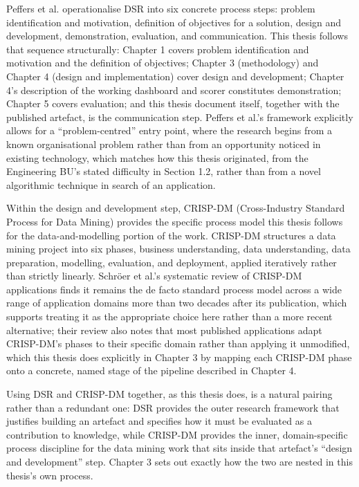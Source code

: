 \documentclass[12pt,oneside]{report}
\begin{document}
Peffers et al. \citep{peffers2007design} operationalise DSR into six
concrete process steps: problem identification and motivation,
definition of objectives for a solution, design and development,
demonstration, evaluation, and communication. This thesis follows that
sequence structurally: Chapter 1 covers problem identification and
motivation and the definition of objectives; Chapter 3 (methodology) and
Chapter 4 (design and implementation) cover design and development;
Chapter 4's description of the working dashboard and scorer constitutes
demonstration; Chapter 5 covers evaluation; and this thesis document
itself, together with the published artefact, is the communication step.
Peffers et al.'s framework explicitly allows for a ``problem-centred''
entry point, where the research begins from a known organisational
problem rather than from an opportunity noticed in existing technology,
which matches how this thesis originated, from the Engineering BU's
stated difficulty in Section 1.2, rather than from a novel algorithmic
technique in search of an application.

Within the design and development step, CRISP-DM (Cross-Industry
Standard Process for Data Mining) \citep{chapman2000crispdm} provides
the specific process model this thesis follows for the
data-and-modelling portion of the work. CRISP-DM structures a data
mining project into six phases, business understanding, data
understanding, data preparation, modelling, evaluation, and deployment,
applied iteratively rather than strictly linearly. Schröer et al.'s
systematic review of CRISP-DM applications \citep{schroer2021systematic}
finds it remains the de facto standard process model across a wide range
of application domains more than two decades after its publication,
which supports treating it as the appropriate choice here rather than a
more recent alternative; their review also notes that most published
applications adapt CRISP-DM's phases to their specific domain rather
than applying it unmodified, which this thesis does explicitly in
Chapter 3 by mapping each CRISP-DM phase onto a concrete, named stage of
the pipeline described in Chapter 4.

Using DSR and CRISP-DM together, as this thesis does, is a natural
pairing rather than a redundant one: DSR provides the outer research
framework that justifies building an artefact and specifies how it must
be evaluated as a contribution to knowledge, while CRISP-DM provides the
inner, domain-specific process discipline for the data mining work that
sits inside that artefact's ``design and development'' step. Chapter 3
sets out exactly how the two are nested in this thesis's own process.
\end{document}
